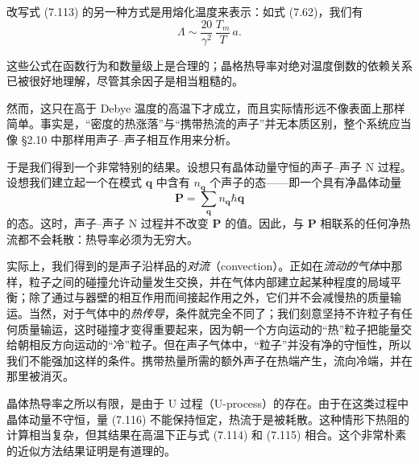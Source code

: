 改写式 (7.113) 的另一种方式是用熔化温度来表示：如式 (7.62)，我们有
\begin{equation*}
\Lambda\sim\frac{20}{\gamma^{2}}\,\frac{T_{m}}{T}\,a.\tag{7.115}
\end{equation*}

这些公式在函数行为和数量级上是合理的；晶格热导率对绝对温度倒数的依赖关系已被很好地理解，尽管其余因子是相当粗糙的。

然而，这只在高于 Debye 温度的高温下才成立，而且实际情形远不像表面上那样简单。事实是，“密度的热涨落”与“携带热流的声子”并无本质区别，整个系统应当像 §2.10 中那样用声子--声子相互作用来分析。

于是我们得到一个非常特别的结果。设想只有晶体动量守恒的声子--声子 N 过程。设想我们建立起一个在模式 $\mathbf{q}$ 中含有 $n_{\mathbf{q}}$ 个声子的态——即一个具有净晶体动量
\begin{equation*}
\mathbf{P}=\sum_{\mathbf{q}}n_{\mathbf{q}}\hbar\mathbf{q}\tag{7.116}
\end{equation*}
的态。这时，声子--声子 N 过程并不改变 $\mathbf{P}$ 的值。因此，与 $\mathbf{P}$ 相联系的任何净热流都不会耗散：热导率必须为无穷大。

实际上，我们得到的是声子沿样品的\emph{对流}（convection）。正如在\emph{流动的气体}中那样，粒子之间的碰撞允许动量发生交换，并在气体内部建立起某种程度的局域平衡；除了通过与器壁的相互作用而间接起作用之外，它们并不会减慢热的质量输运。当然，对于气体中的\emph{热传导}，条件就完全不同了；我们刻意坚持不许粒子有任何质量输运，这时碰撞才变得重要起来，因为朝一个方向运动的“热”粒子把能量交给朝相反方向运动的“冷”粒子。但在声子气体中，“粒子”并没有净的守恒性，所以我们不能强加这样的条件。携带热量所需的额外声子在热端产生，流向冷端，并在那里被消灭。

晶体热导率之所以有限，是由于 U 过程（U-process）的存在。由于在这类过程中晶体动量不守恒，量 (7.116) 不能保持恒定，热流于是被耗散。这种情形下热阻的计算相当复杂，但其结果在高温下正与式 (7.114) 和 (7.115) 相合。这个非常朴素的近似方法结果证明是有道理的。

